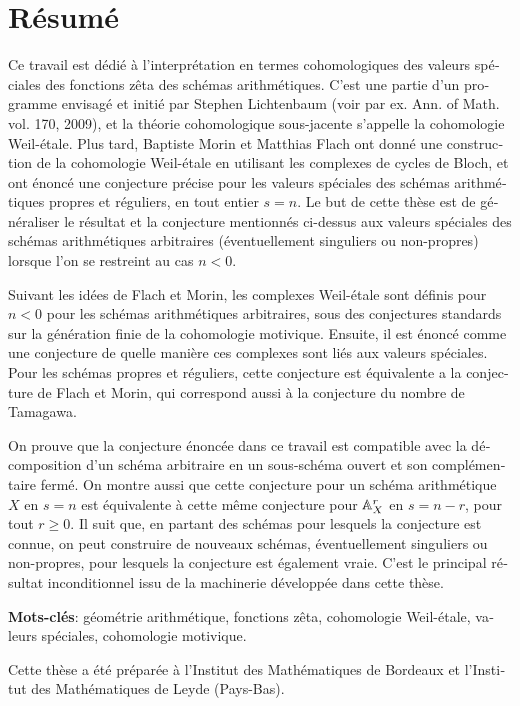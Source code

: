\chapter*{Résumé}

\begin{otherlanguage}{french}
  Ce travail est dédié à l'interprétation en termes cohomologiques des valeurs
  spéciales des fonctions zêta des schémas arithmétiques. C'est une partie d'un
  programme envisagé et initié par Stephen Lichtenbaum (voir par ex.
  Ann. of Math. vol. 170, 2009), et la théorie cohomologique sous-jacente
  s'appelle la cohomologie Weil-étale. Plus tard, Baptiste Morin et Matthias
  Flach ont donné une construction de la cohomologie Weil-étale en utilisant les
  complexes de cycles de Bloch, et ont énoncé une conjecture précise pour les
  valeurs spéciales des schémas arithmétiques propres et réguliers, en tout
  entier $s=n$. Le but de cette thèse est de généraliser le résultat et la
  conjecture mentionnés ci-dessus aux valeurs spéciales des schémas
  arithmétiques arbitraires (éventuellement singuliers ou non-propres) lorsque
  l'on se restreint au cas $n<0$.

  Suivant les idées de Flach et Morin, les complexes Weil-étale sont définis
  pour $n < 0$ pour les schémas arithmétiques arbitraires, sous des conjectures
  standards sur la génération finie de la cohomologie motivique. Ensuite, il est
  énoncé comme une conjecture de quelle manière ces complexes sont liés aux
  valeurs spéciales. Pour les schémas propres et réguliers, cette conjecture est
  équivalente a la conjecture de Flach et Morin, qui correspond aussi à la
  conjecture du nombre de Tamagawa.

  On prouve que la conjecture énoncée dans ce travail est compatible avec la
  décomposition d'un schéma arbitraire en un sous-schéma ouvert et son
  complémentaire fermé. On montre aussi que cette conjecture pour un schéma
  arithmétique $X$ en $s=n$ est équivalente à cette même conjecture pour
  $\AA^r_X$ en $s=n-r$, pour tout $r\geq 0$. Il suit que, en partant des schémas
  pour lesquels la conjecture est connue, on peut construire de nouveaux
  schémas, éventuellement singuliers ou non-propres, pour lesquels la conjecture
  est également vraie. C'est le principal résultat inconditionnel issu de la
  machinerie développée dans cette thèse.

  \ifdutch
  \else
  \pagebreak
  \noindent\textbf{Mots-clés}: géométrie arithmétique, fonctions zêta,
  cohomologie Weil-étale, valeurs spéciales, cohomologie motivique.

  Cette thèse a été préparée à l'Institut des Mathématiques de Bordeaux et
  l'Institut des Mathématiques de Leyde (Pays-Bas).
  \fi
\end{otherlanguage}
